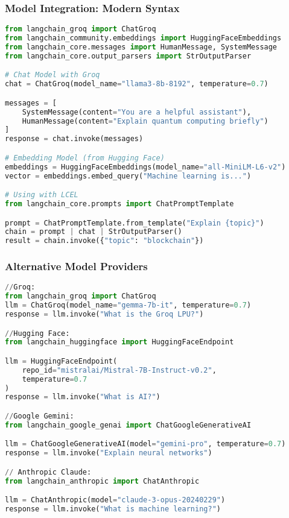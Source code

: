 \begin{frame}[fragile]\frametitle{Model Integration: Modern Syntax}

\begin{lstlisting}[language=python, basicstyle=\tiny]
from langchain_groq import ChatGroq
from langchain_community.embeddings import HuggingFaceEmbeddings
from langchain_core.messages import HumanMessage, SystemMessage
from langchain_core.output_parsers import StrOutputParser

# Chat Model with Groq
chat = ChatGroq(model_name="llama3-8b-8192", temperature=0.7)

messages = [
    SystemMessage(content="You are a helpful assistant"),
    HumanMessage(content="Explain quantum computing briefly")
]
response = chat.invoke(messages)

# Embedding Model (from Hugging Face)
embeddings = HuggingFaceEmbeddings(model_name="all-MiniLM-L6-v2")
vector = embeddings.embed_query("Machine learning is...")

# Using with LCEL
from langchain_core.prompts import ChatPromptTemplate

prompt = ChatPromptTemplate.from_template("Explain {topic}")
chain = prompt | chat | StrOutputParser()
result = chain.invoke({"topic": "blockchain"})
\end{lstlisting}

\end{frame}

\begin{frame}[fragile]\frametitle{Alternative Model Providers}


\begin{lstlisting}[language=python, basicstyle=\tiny]
//Groq:
from langchain_groq import ChatGroq
llm = ChatGroq(model_name="gemma-7b-it", temperature=0.7)
response = llm.invoke("What is the Groq LPU?")

//Hugging Face:
from langchain_huggingface import HuggingFaceEndpoint

llm = HuggingFaceEndpoint(
    repo_id="mistralai/Mistral-7B-Instruct-v0.2",
    temperature=0.7
)
response = llm.invoke("What is AI?")

//Google Gemini:
from langchain_google_genai import ChatGoogleGenerativeAI

llm = ChatGoogleGenerativeAI(model="gemini-pro", temperature=0.7)
response = llm.invoke("Explain neural networks")

// Anthropic Claude:
from langchain_anthropic import ChatAnthropic

llm = ChatAnthropic(model="claude-3-opus-20240229")
response = llm.invoke("What is machine learning?")
\end{lstlisting}

\end{frame}

